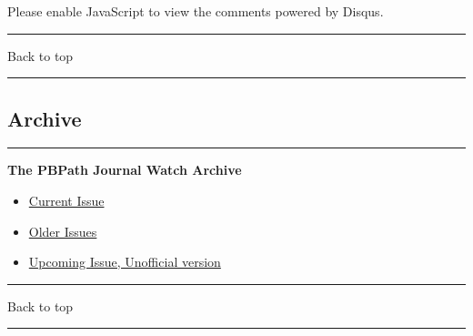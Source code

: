 \documentclass[]{article}
\begin{document}
Please enable JavaScript to view the comments powered by Disqus.

\begin{center}\rule{0.5\linewidth}{\linethickness}\end{center}

Back to top

\begin{center}\rule{0.5\linewidth}{\linethickness}\end{center}

\pagebreak

\hypertarget{archive}{%
\subsection{Archive}\label{archive}}

\begin{center}\rule{0.5\linewidth}{\linethickness}\end{center}

\textbf{The PBPath Journal Watch Archive}

\begin{itemize}
\item
  \href{http://pbpath.org/journal-watch/}{Current Issue}
\item
  \href{http://pbpath.org/journal-watch-archive/}{Older Issues}
\item
  \href{http://pbpath.org/journal-watch-upcoming-issue/}{Upcoming Issue,
  Unofficial version}
\end{itemize}

\begin{center}\rule{0.5\linewidth}{\linethickness}\end{center}

Back to top

\begin{center}\rule{0.5\linewidth}{\linethickness}\end{center}

\pagebreak
\end{document}
